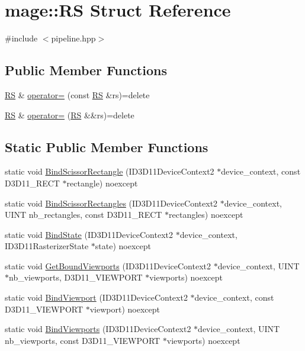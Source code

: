 \hypertarget{structmage_1_1_r_s}{}\section{mage\+:\+:RS Struct Reference}
\label{structmage_1_1_r_s}


{\ttfamily \#include $<$pipeline.\+hpp$>$}

\subsection*{Public Member Functions}
\begin{DoxyCompactItemize}
\item 
\hyperlink{structmage_1_1_r_s}{RS} \& \hyperlink{structmage_1_1_r_s_aea2e489f1a5d9f8d5edc94fd576cd5fe}{operator=} (const \hyperlink{structmage_1_1_r_s}{RS} \&rs)=delete
\item 
\hyperlink{structmage_1_1_r_s}{RS} \& \hyperlink{structmage_1_1_r_s_a2347c2cf4619806ed4d9e39ad3f8d6dd}{operator=} (\hyperlink{structmage_1_1_r_s}{RS} \&\&rs)=delete
\end{DoxyCompactItemize}
\subsection*{Static Public Member Functions}
\begin{DoxyCompactItemize}
\item 
static void \hyperlink{structmage_1_1_r_s_a5ccd88302a0e6b41ad8abfeedac6e695}{Bind\+Scissor\+Rectangle} (I\+D3\+D11\+Device\+Context2 $\ast$device\+\_\+context, const D3\+D11\+\_\+\+R\+E\+CT $\ast$rectangle) noexcept
\item 
static void \hyperlink{structmage_1_1_r_s_aef6f6eca8780c0be18af2b55d93f7c05}{Bind\+Scissor\+Rectangles} (I\+D3\+D11\+Device\+Context2 $\ast$device\+\_\+context, U\+I\+NT nb\+\_\+rectangles, const D3\+D11\+\_\+\+R\+E\+CT $\ast$rectangles) noexcept
\item 
static void \hyperlink{structmage_1_1_r_s_a62fcfb14eb7466822b2633cb30603036}{Bind\+State} (I\+D3\+D11\+Device\+Context2 $\ast$device\+\_\+context, I\+D3\+D11\+Rasterizer\+State $\ast$state) noexcept
\item 
static void \hyperlink{structmage_1_1_r_s_a4c0a27cc5256005c487ceb8510f8e57f}{Get\+Bound\+Viewports} (I\+D3\+D11\+Device\+Context2 $\ast$device\+\_\+context, U\+I\+NT $\ast$nb\+\_\+viewports, D3\+D11\+\_\+\+V\+I\+E\+W\+P\+O\+RT $\ast$viewports) noexcept
\item 
static void \hyperlink{structmage_1_1_r_s_a094b7a816b146971b2489fe43a7c1411}{Bind\+Viewport} (I\+D3\+D11\+Device\+Context2 $\ast$device\+\_\+context, const D3\+D11\+\_\+\+V\+I\+E\+W\+P\+O\+RT $\ast$viewport) noexcept
\item 
static void \hyperlink{structmage_1_1_r_s_aca58db7ea856bb645120898889bc89d1}{Bind\+Viewports} (I\+D3\+D11\+Device\+Context2 $\ast$device\+\_\+context, U\+I\+NT nb\+\_\+viewports, const D3\+D11\+\_\+\+V\+I\+E\+W\+P\+O\+RT $\ast$viewports) noexcept
\end{DoxyCompactItemize}
